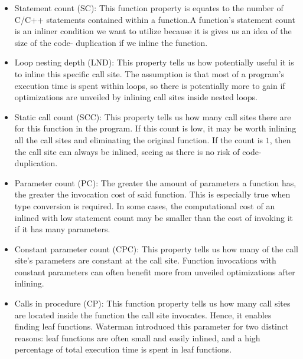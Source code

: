 \begin{itemize}

	\item Statement count (SC): This function property is equates to the number of
C/C++ statements contained within a function.A function's statement count is an
inliner condition we want to utilize because it is gives us an idea of the size
of the code- duplication if we inline the function.

	\item Loop nesting depth (LND): This property tells us how potentially useful it
is to inline this specific call site. The assumption is that most of a program's
execution time is spent within loops, so there is potentially more to gain if
optimizations are unveiled by inlining call sites inside nested loops.

	\item Static call count (SCC): This property tells us how many call sites there
are for this function in the program. If this count is low, it may be worth
inlining all the call sites and eliminating the original function. If the count
is $1$, then the call site can always be inlined, seeing as there is no risk of
code-duplication.

	\item Parameter count (PC): The greater the amount of parameters a function has,
the greater the invocation cost of said function. This is especially true when
type conversion is required. In some cases, the computational cost of an inlined
with low statement count may be smaller than the cost of invoking it if it has
many parameters\cite{AdaptvCompilAndInlingWaterman}.

	\item Constant parameter count (CPC): This property tells us how many of the call
site's parameters are constant at the call site. Function invocations with
constant parameters can often benefit more from unveiled optimizations after
inlining.

	\item Calls in procedure (CP): This function property tells us how many call
sites are located inside the function the call site invocates. Hence, it enables
finding leaf functions. Waterman\cite{AdaptvCompilAndInlingWaterman} introduced
this parameter for two distinct reasons: leaf functions are often small and
easily inlined, and a high percentage of total execution time is spent in leaf
functions.

\end{itemize}
